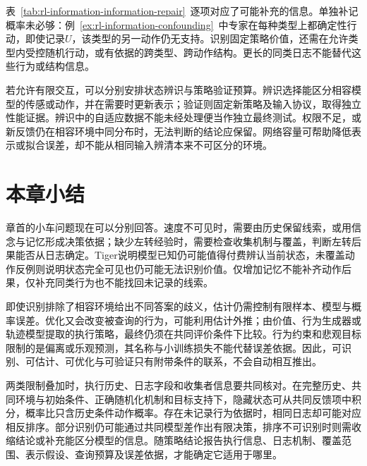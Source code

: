 表~\ref{tab:rl-information-information-repair}~逐项对应了可能补充的信息。单独补记概率未必够：例~\ref{ex:rl-information-confounding}~中专家在每种类型上都确定性行动，即使记录$U$，该类型的另一动作仍无支持。识别固定策略价值，还需在允许类型内受控随机行动，或有依据的跨类型、跨动作结构。更长的同类日志不能替代这些行为或结构信息。

若允许有限交互，可以分别安排状态辨识与策略验证预算。辨识选择能区分相容模型的传感或动作，并在需要时更新表示；验证则固定新策略及输入协议，取得独立性能证据。辨识中的自适应数据不能未经处理便当作独立最终测试。权限不足，或新反馈仍在相容环境中同分布时，无法判断的结论应保留。网络容量可帮助降低表示或拟合误差，却不能从相同输入辨清本来不可区分的环境。

\section{本章小结}
\label{sec:rl-information-summary}

章首的小车问题现在可以分别回答。速度不可见时，需要由历史保留线索，或用信念与记忆形成决策依据；缺少左转经验时，需要检查收集机制与覆盖，判断左转后果能否从日志确定。Tiger说明模型已知仍可能值得付费辨认当前状态，未覆盖动作反例则说明状态完全可见也仍可能无法识别价值。仅增加记忆不能补齐动作后果，仅补充同类行为也不能找回未记录的线索。

即使识别排除了相容环境给出不同答案的歧义，估计仍需控制有限样本、模型与概率误差。优化又会改变被查询的行为，可能利用估计外推；由价值、行为生成器或轨迹模型提取的执行策略，最终仍须在共同评价条件下比较。行为约束和悲观目标限制的是偏离或乐观预测，其名称与小训练损失不能代替误差依据。因此，可识别、可估计、可优化与可验证只有附带条件的联系，不会自动相互推出。

两类限制叠加时，执行历史、日志字段和收集者信息要共同核对。在完整历史、共同环境与初始条件、正确随机化机制和目标支持下，隐藏状态可从共同反馈项中积分，概率比只含历史条件动作概率。存在未记录行为依据时，相同日志却可能对应相反排序。部分识别仍可能通过共同模型差作出有限决策，排序不可识别时则需收缩结论或补充能区分模型的信息。随策略结论报告执行信息、日志机制、覆盖范围、表示假设、查询预算及误差依据，才能确定它适用于哪里。

